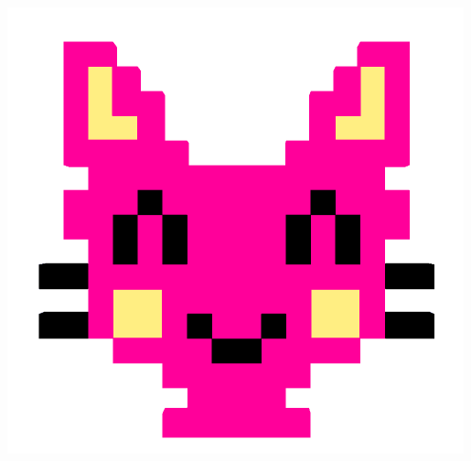 \documentclass[a4paper,12pt,oneside]{lauluvihko}
\begin{document}
   \thispagestyle{empty}
   \vfill
    \begin{center}
      \includegraphics{kansi.png}
    \end{center}
   \vfill
   \newpage
   \tableofcontents
   \newpage
\end{document}
